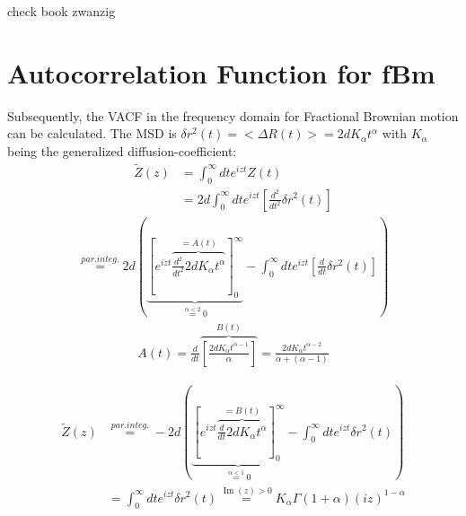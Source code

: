 \documentclass[
  a4paper,BCOR10mm,oneside,
  bibtotoc,idxtotoc,
  headsepline,footsepline,%
  fleqn,openbib
]{scrbook}
\begin{document}
check book zwanzig

\section{Autocorrelation Function for fBm}
Subsequently, the VACF in the frequency domain for Fractional Brownian motion can be calculated. The MSD is $\delta r^{2}(t)= < \Delta R(t)>=2dK_{\alpha}t^{\alpha}$ with $K_{\alpha}$ being the generalized diffusion-coefficient:
\begin{align*}
 \tilde{Z}(z)&=\int_{0}^{\infty} d t e^{izt} Z(t) \\
 &=2 d \int_{0}^{\infty} d t e^{izt} \left[\frac{d^2}{dt^2}\delta r^2 (t) \right]
\end{align*}
\begin{align*}
  \stackrel{par. integ.}{=} 2d \left( \underbrace{\left [ e^{izt}\overbrace{ \frac{d^2}{dt^2} 2dK_{\alpha}t^{\alpha}}^{=A(t)} \right]_{0}^{\infty}}_{\stackrel{\alpha < 2} {=} 0}-\int_{0}^{\infty} d t e^{izt} \left[\frac{d}{dt}\delta r^2 (t)\right] \right) 
 \end{align*}
 \begin{align*}
 A(t)=\frac{d}{dt}\overbrace{ \left [\frac{2d K_{\alpha}t^{\alpha-1}}{\alpha} \right ]}^{B(t)}=\frac{2d K_{\alpha}t^{\alpha-2}}{\alpha+(\alpha-1)}
\end{align*}

\begin{align*}
 \tilde{Z}(z) & \stackrel{par. integ.}{=} - 2d \left( \underbrace{\left [ e^{izt}\overbrace{ \frac{d}{dt} 2dK_{\alpha}t^{\alpha}}^{=B(t)} \right]_{0}^{\infty}}_{\stackrel{\alpha < 1} {=} 0}-\int_{0}^{\infty} d t e^{izt} \delta r^2 (t) \right) \\
  & = \int_{0}^{\infty} d t e^{izt} \delta r^2 (t)  \stackrel{\operatorname{Im}(z)> 0} {=}  K_{\alpha} \Gamma(1+\alpha)(i z)^{1-\alpha}
\end{align*}
%

\nocite{}



\end{document}
